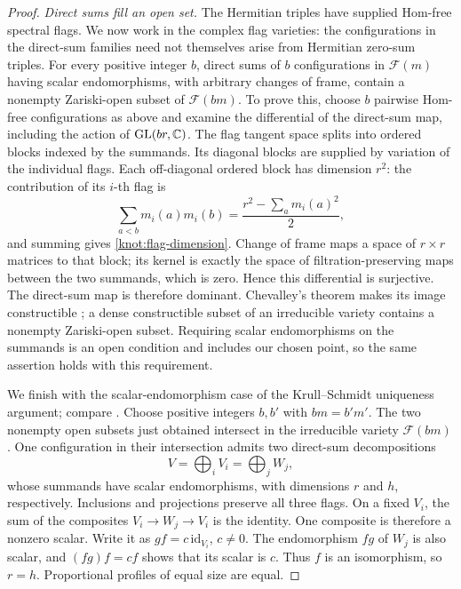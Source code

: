 \begin{proof}
\emph{Direct sums fill an open set.}
The Hermitian triples have supplied Hom-free spectral flags.  We now
work in the complex flag varieties: the configurations in the
direct-sum families need not themselves arise from Hermitian
zero-sum triples.  For every positive integer \(b\), direct sums of
\(b\) configurations in \(\mathcal F(m)\) having scalar endomorphisms, with arbitrary
changes of frame, contain a nonempty Zariski-open subset of
\(\mathcal F(bm)\).  To prove this, choose \(b\) pairwise Hom-free
configurations as above and examine the differential of the direct-sum
map, including the action of \(\operatorname{GL}(br,\mathbb C)\).  The flag tangent space
splits into ordered blocks indexed by the summands.  Its diagonal
blocks are supplied by variation of the individual flags.  Each
off-diagonal ordered block has dimension \(r^2\): the contribution
of its \(i\)-th flag is
\[
 \sum_{a<b}m_i(a)m_i(b)
 =\frac{r^2-\sum_a m_i(a)^2}{2},
\]
and summing gives \eqref{knot:flag-dimension}.  Change of
frame maps a space of \(r\times r\) matrices to that block; its kernel
is exactly the space of filtration-preserving maps between the two
summands, which is zero.  Hence this differential is surjective.
The direct-sum map is therefore dominant.  Chevalley's theorem makes
its image constructible \cite[Tag~054K]{StacksProject}; a dense
constructible subset of an irreducible variety contains a nonempty
Zariski-open subset.  Requiring scalar
endomorphisms on the summands is an open condition and includes our
chosen point, so the same assertion holds with this requirement.

We finish with the scalar-endomorphism case of the Krull--Schmidt
uniqueness argument; compare \cite[Theorem~1]{Atiyah1956}.
Choose positive integers \(b,b'\) with \(bm=b'm'\).  The two nonempty
open subsets just obtained intersect in the irreducible variety
\(\mathcal F(bm)\).  One configuration in their intersection admits
two direct-sum decompositions
\[
 V=\bigoplus_i V_i=\bigoplus_j W_j,
\]
whose summands have scalar endomorphisms, with dimensions \(r\) and
\(h\), respectively.  Inclusions and projections preserve all three
flags.  On a fixed \(V_i\), the sum of the composites
\(V_i\to W_j\to V_i\) is the identity.  One composite is therefore
a nonzero scalar.  Write it as \(gf=c\,\mathrm{id}_{V_i}\), \(c\ne0\).
The endomorphism \(fg\) of \(W_j\) is also scalar, and
\((fg)f=cf\) shows that its scalar is \(c\).  Thus \(f\) is an
isomorphism, so \(r=h\).  Proportional profiles of equal size are equal.
\end{proof}

